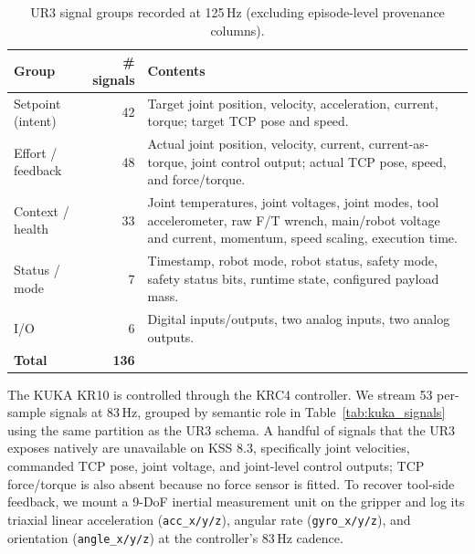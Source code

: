 \documentclass{article}
\begin{document}
\begin{table}[htbp]
    \centering
    \caption{UR3 signal groups recorded at 125\,Hz (excluding episode-level provenance columns).}
    \label{tab:ur3_signals}
    \small
    \begin{tabular}{@{}lrp{7.5cm}@{}}
        \toprule
        Group             & \# signals   & Contents                                                                                                                                                      \\
        \midrule
        Setpoint (intent) & 42           & Target joint position, velocity, acceleration, current, torque; target TCP pose and speed.                                                                    \\
        Effort / feedback & 48           & Actual joint position, velocity, current, current-as-torque, joint control output; actual TCP pose, speed, and force/torque.                                  \\
        Context / health  & 33           & Joint temperatures, joint voltages, joint modes, tool accelerometer, raw F/T wrench, main/robot voltage and current, momentum, speed scaling, execution time. \\
        Status / mode     & 7            & Timestamp, robot mode, robot status, safety mode, safety status bits, runtime state, configured payload mass.                                                 \\
        I/O               & 6            & Digital inputs/outputs, two analog inputs, two analog outputs.                                                                                                \\
        \midrule
        \textbf{Total}    & \textbf{136} &                                                                                                                                                               \\
        \bottomrule
    \end{tabular}
\end{table}

The KUKA KR10 is controlled through the KRC4 controller. We stream 53 per-sample signals at 83\,Hz, grouped by semantic role in Table~\ref{tab:kuka_signals} using the same partition as the UR3 schema. A handful of signals that the UR3 exposes natively are unavailable on KSS 8.3, specifically joint velocities, commanded TCP pose, joint voltage, and joint-level control outputs; TCP force/torque is also absent because no force sensor is fitted. To recover tool-side feedback, we mount a 9-DoF inertial measurement unit on the gripper and log its triaxial linear acceleration (\texttt{acc\_x/y/z}), angular rate (\texttt{gyro\_x/y/z}), and orientation (\texttt{angle\_x/y/z}) at the controller's 83\,Hz cadence.
\end{document}

